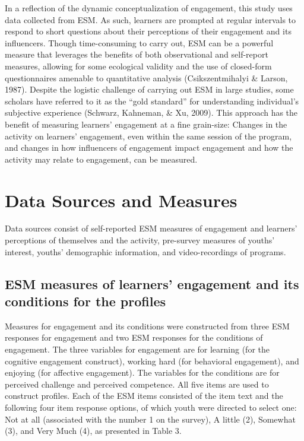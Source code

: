 \documentclass[]{msu-thesis}
\theoremstyle{definition}
\theoremstyle{definition}
\theoremstyle{definition}
\theoremstyle{remark}
\begin{document}
In a reflection of the dynamic conceptualization of engagement, this
study uses data collected from ESM. As such, learners are prompted at
regular intervals to respond to short questions about their perceptions
of their engagement and its influencers. Though time-consuming to carry
out, ESM can be a powerful measure that leverages the benefits of both
observational and self-report measures, allowing for some ecological
validity and the use of closed-form questionnaires amenable to
quantitative analysis (Csikszentmihalyi \& Larson, 1987). Despite the
logistic challenge of carrying out ESM in large studies, some scholars
have referred to it as the ``gold standard'' for understanding
individual's subjective experience (Schwarz, Kahneman, \& Xu, 2009).
This approach has the benefit of measuring learners' engagement at a
fine grain-size: Changes in the activity on learners' engagement, even
within the same session of the program, and changes in how influencers
of engagement impact engagement and how the activity may relate to
engagement, can be measured.

\section{Data Sources and Measures}\label{data-sources-and-measures}

Data sources consist of self-reported ESM measures of engagement and
learners' perceptions of themselves and the activity, pre-survey
measures of youths' interest, youths' demographic information, and
video-recordings of programs.

\subsection{ESM measures of learners' engagement and its conditions for
the
profiles}\label{esm-measures-of-learners-engagement-and-its-conditions-for-the-profiles}

Measures for engagement and its conditions were constructed from three
ESM responses for engagement and two ESM responses for the conditions of
engagement. The three variables for engagement are for learning (for the
cognitive engagement construct), working hard (for behavioral
engagement), and enjoying (for affective engagement). The variables for
the conditions are for perceived challenge and perceived competence. All
five items are used to construct profiles. Each of the ESM items
consisted of the item text and the following four item response options,
of which youth were directed to select one: Not at all (associated with
the number 1 on the survey), A little (2), Somewhat (3), and Very Much
(4), as presented in Table 3.
\end{document}

